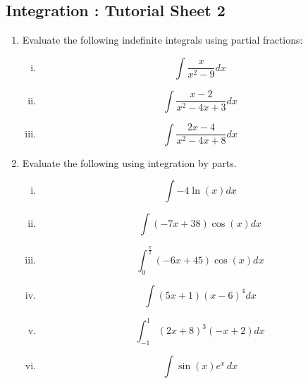 \documentclass[a4paper,12pt]{article}
\begin{document}
\subsection*{Integration : Tutorial Sheet 2}

\begin{enumerate}
\item Evaluate the following indefinite integrals using partial fractions:
\begin{multicols}{2}
	\begin{enumerate}[(i)]
		
		\item \[ \int \frac{x}{x^2-9} dx  \]
		
		\item \[ \int \frac{x-2}{x^2 - 4x + 3} dx  \]
		
		\item \[ \int \frac{2x-4}{x^2 - 4x + 8} dx  \]
		
	\end{enumerate}
\end{multicols}

\item Evaluate the following using integration by parts.

\begin{multicols}{2}
	\begin{enumerate}[(i)]
		\item \[ \int -4\ln\left(x\right)dx\]
		
		\item \[ \int\left(-7x+38\right)\cos\left(x\right)dx\]
		
		\item  \[\int_0^\frac{\pi}{2}\left(-6x+45\right)\cos\left(x\right)dx\]
		
		
		\item \[ \int\left(5x+1\right)\left(x-6\right)^4 dx\]
		
		
		\item \[ \int_{-1}^1 \left(2x+8\right)^3\left(-x+2\right)dx\]
		
		
		\item \[ \int \sin\left(x\right) e^x\, dx \] 
	\end{enumerate}
\end{multicols}


\end{enumerate}
\end{document}
